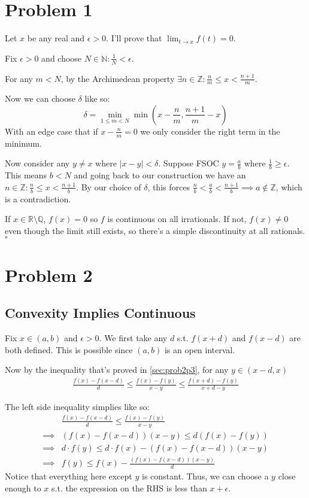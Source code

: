 \documentclass[12pt]{article}
\newcommand{\N}{\mathbb{N}}
\newcommand{\R}{\mathbb{R}}
\newcommand{\Z}{\mathbb{Z}}
\newcommand{\Q}{\mathbb{Q}}
\begin{document}
\section{Problem 1}

Let $x$ be any real and $\epsilon > 0$.
I'll prove that $\lim_{t \to x} f(t) = 0$.

Fix $\epsilon > 0$ and choose $N \in \N: \frac{1}{N} < \epsilon$.

For any $m < N$, by the Archimedean property $\exists n \in \Z: \frac{n}{m} \le x < \frac{n+1}{m}$.

Now we can choose $\delta$ like so:
\[\delta = \min_{1 \le m < N} \min\left(x-\frac{n}{m}, \frac{n+1}{m}-x\right)\]
With an edge case that if $x - \frac{n}{m} = 0$ we only consider the right term in the minimum.

Now consider any $y \ne x$ where $|x-y| < \delta$.
Suppose FSOC $y=\frac{a}{b}$ where $\frac{1}{b} \ge \epsilon$.
This means $b < N$ and going back to our construction we have an
$n \in \Z: \frac{n}{b} \le x < \frac{n+1}{b}$.
By our choice of $\delta$, this forces $\frac{n}{b} < \frac{a}{b} < \frac{n+1}{b} \implies a \notin \Z$,
which is a contradiction.

If $x \in \R \setminus \Q$, $f(x)=0$ so $f$ is continuous on all irrationals.
If not, $f(x) \ne 0$ even though the limit still exists, so there's a simple
discontinuity at all rationals. $\square$

\pagebreak

\section{Problem 2}

\subsection{Convexity Implies Continuous}

Fix $x \in (a, b)$ and $\epsilon > 0$.
We first take any $d$ s.t. $f(x+d)$ and $f(x-d)$ are both defined.
This is possible since $(a, b)$ is an open interval.

Now by the inequality that's proved in \ref{sec:prob2p3}, for any $y \in (x-d, x)$
\begin{align*}
  \frac{f(x)-f(x-d)}{d} \le \frac{f(x)-f(y)}{x-y} \le \frac{f(x+d)-f(y)}{x+d-y}
\end{align*}

The left side inequality simplies like so:
\begin{align*}
             & \frac{f(x)-f(x-d)}{d} \le \frac{f(x)-f(y)}{x-y}    \\
  \implies{} & (f(x)-f(x-d))(x-y) \le d(f(x)-f(y))                \\
  \implies{} & d \cdot f(y) \le d \cdot f(x) - (f(x)-f(x-d))(x-y) \\
  \implies{} & f(y) \le f(x) - \frac{(f(x)-f(x-d))(x-y)}{d}
\end{align*}
Notice that everything here except $y$ is constant.
Thus, we can choose a $y$ close enough to $x$ s.t. the expression on the RHS is less than $x+\epsilon$.
\end{document}
